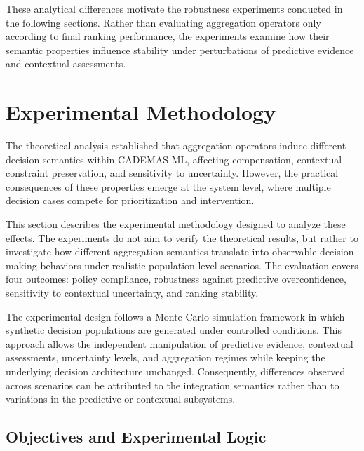 \documentclass[mathematics,article,submit,moreauthors]{Definitions/mdpi}
\begin{document}
These analytical differences motivate the robustness experiments
conducted in the following sections. Rather than evaluating aggregation
operators only according to final ranking performance, {\color{teal}the
experiments examine how} their semantic properties influence stability
under perturbations of predictive evidence and contextual assessments.



\section{Experimental Methodology}
\label{sect:experimental-methodology}


The theoretical analysis established that aggregation operators induce
different decision semantics within CADEMAS-ML, affecting compensation,
contextual constraint preservation, and sensitivity to uncertainty.
However, the practical consequences of these properties emerge at the
system level, where multiple decision cases compete for prioritization
and intervention.

This section describes the experimental methodology designed to analyze
these effects. The experiments do not aim to verify the theoretical
results, but rather to investigate how different aggregation semantics
translate into observable decision-making behaviors under realistic
population-level scenarios. {\color{teal}The evaluation covers four
outcomes: policy compliance, robustness against predictive overconfidence,
sensitivity to contextual uncertainty, and ranking stability.}

The experimental design follows a Monte Carlo simulation framework in
which synthetic decision populations are generated under controlled
conditions. This approach allows the independent manipulation of
predictive evidence, contextual assessments, uncertainty levels, and
aggregation regimes while keeping the underlying decision architecture
unchanged. Consequently, differences observed across scenarios can be
attributed to the integration semantics rather than to variations in the
predictive or contextual subsystems.

\subsection{Objectives and Experimental Logic}
\label{subsec:experimental-objectives}
%
\end{document}
